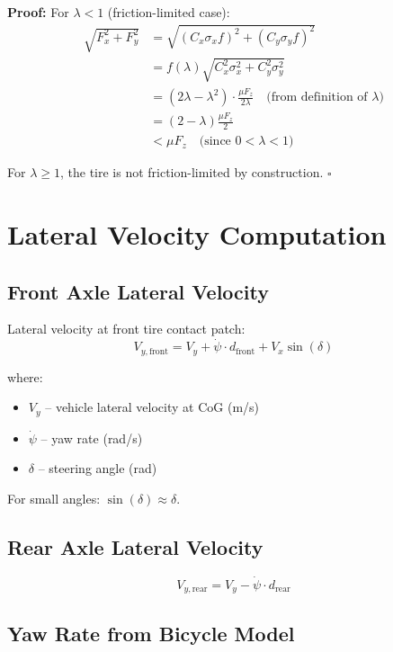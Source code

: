 \documentclass[11pt,a4paper]{article}
\begin{document}
\textbf{Proof:} For $\lambda < 1$ (friction-limited case):
\begin{align}
\sqrt{F_x^2 + F_y^2} &= \sqrt{(C_x \sigma_x f)^2 + (C_y \sigma_y f)^2} \\
&= f(\lambda) \sqrt{C_x^2 \sigma_x^2 + C_y^2 \sigma_y^2} \\
&= (2\lambda - \lambda^2) \cdot \frac{\mu F_z}{2\lambda} \quad \text{(from definition of $\lambda$)} \\
&= \left(2 - \lambda\right) \frac{\mu F_z}{2} \\
&< \mu F_z \quad \text{(since } 0 < \lambda < 1\text{)}
\end{align}

For $\lambda \geq 1$, the tire is not friction-limited by construction. $\square$

\section{Lateral Velocity Computation}

\subsection{Front Axle Lateral Velocity}

Lateral velocity at front tire contact patch:
\begin{equation}
V_{y,\text{front}} = V_y + \dot{\psi} \cdot d_{\text{front}} + V_x \sin(\delta)
\end{equation}

where:
\begin{itemize}
    \item $V_y$ -- vehicle lateral velocity at CoG (m/s)
    \item $\dot{\psi}$ -- yaw rate (rad/s)
    \item $\delta$ -- steering angle (rad)
\end{itemize}

For small angles: $\sin(\delta) \approx \delta$.

\subsection{Rear Axle Lateral Velocity}

\begin{equation}
V_{y,\text{rear}} = V_y - \dot{\psi} \cdot d_{\text{rear}}
\end{equation}

\subsection{Yaw Rate from Bicycle Model}
\end{document}
